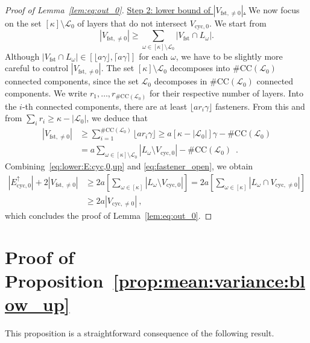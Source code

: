 \documentclass[final]{colt2026}
\newcommand{\1}{\mathbf{1}}
\begin{document}
\begin{proof}[Proof of Lemma~\ref{lem:eq:out_0}]
\noindent
\underline{Step 2: lower bound of $|V_{\mathrm{fst},\neq 0}|$.} We now focus on the set $[\kappa]\setminus \mathcal{L}_0$ of layers that do not intersect $V_{\mathrm{cyc},0}$. We start from 
\[
|V_{\mathrm{fst},\neq 0}|\geq \sum_{\omega\in [\kappa]\setminus \mathcal{L}_0} |V_{\mathrm{fst}}\cap L_{\omega}|.
\]
Although $|V_{\mathrm{fst}}\cap L_{\omega}|\in [\lfloor a\gamma\rfloor, \lceil a\gamma\rceil]$ for each $\omega$, we have to be slightly more careful to control $|V_{\mathrm{fst},\neq 0}|$. The set $[\kappa]\setminus \mathcal{L}_0$ decomposes into $\#\mathrm{CC}(\mathcal L_0)$ connected components, since the set $\mathcal L_0$ decomposes in $\#\mathrm{CC}(\mathcal L_0)$ connected components. We write $r_1,\ldots, r_{\#\mathrm{CC}(\mathcal L_0)}$ for their respective number of layers. Into the $i$-th connected components, there are at least $\lfloor a r_i\gamma\rfloor$ fasteners. From this and from $\sum_i r_i \geq \kappa - |\mathcal L_0|$, we deduce that 
\begin{align}\nonumber
|V_{\mathrm{fst},\neq 0}|&\geq \sum_{i=1}^{\#\mathrm{CC}(\mathcal L_0)} \lfloor a r_i \gamma\rfloor \geq a \left[\kappa - |\mathcal{L}_0|\right]\gamma - \#\mathrm{CC}(\mathcal L_0)\\
&= a \sum_{\omega\in [\kappa]\setminus \mathcal L_0}|L_{\omega}\setminus V_{\mathrm{cyc},0}|   - \#\mathrm{CC}(\mathcal L_0)\enspace . \label{eq:fastener_open}
\end{align}
Combining~\eqref{eq:lower:E:cyc,0,up} and \eqref{eq:fastener_open}, we obtain 
\begin{align*}
|E_{\mathrm{cyc},0}^{\uparrow}|+ 2 |V_{\mathrm{fst},\neq 0}| &\geq  2a \left[\sum_{\omega\in [\kappa]}|L_{\omega}\setminus V_{\mathrm{cyc},0}| \right] =  2a \left[\sum_{\omega\in [\kappa]}|L_{\omega}\cap V_{\mathrm{cyc},\neq 0}| \right]\\
& \geq 2a |V_{\mathrm{cyc},\neq 0}|\ ,
\end{align*}
which concludes the proof of Lemma~\ref{lem:eq:out_0}.
\end{proof}




\section{Proof of Proposition~\ref{prop:mean:variance:blow_up}}\label{sec:mean:variance:blow_up}



This proposition is a straightforward consequence of the following result. 
\end{document}
